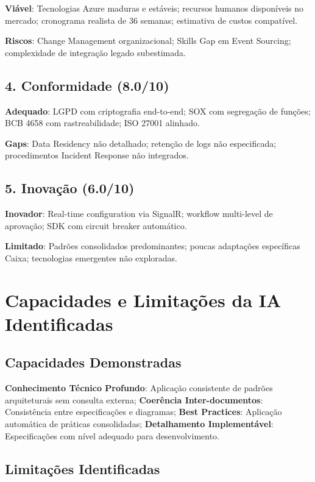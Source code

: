 \textbf{Viável}: Tecnologias Azure maduras e estáveis; recursos humanos disponíveis no mercado; cronograma realista de 36 semanas; estimativa de custos compatível.

\textbf{Riscos}: Change Management organizacional; Skills Gap em Event Sourcing; complexidade de integração legado subestimada.

\subsection{4. Conformidade (8.0/10)}

\textbf{Adequado}: LGPD com criptografia end-to-end; SOX com segregação de funções; BCB 4658 com rastreabilidade; ISO 27001 alinhado.

\textbf{Gaps}: Data Residency não detalhado; retenção de logs não especificada; procedimentos Incident Response não integrados.

\subsection{5. Inovação (6.0/10)}

\textbf{Inovador}: Real-time configuration via SignalR; workflow multi-level de aprovação; SDK com circuit breaker automático.

\textbf{Limitado}: Padrões consolidados predominantes; poucas adaptações específicas Caixa; tecnologias emergentes não exploradas.

\section{Capacidades e Limitações da IA Identificadas}

\subsection{Capacidades Demonstradas}

\textbf{Conhecimento Técnico Profundo}: Aplicação consistente de padrões arquiteturais sem consulta externa; \textbf{Coerência Inter-documentos}: Consistência entre especificações e diagramas; \textbf{Best Practices}: Aplicação automática de práticas consolidadas; \textbf{Detalhamento Implementável}: Especificações com nível adequado para desenvolvimento.

\subsection{Limitações Identificadas}

